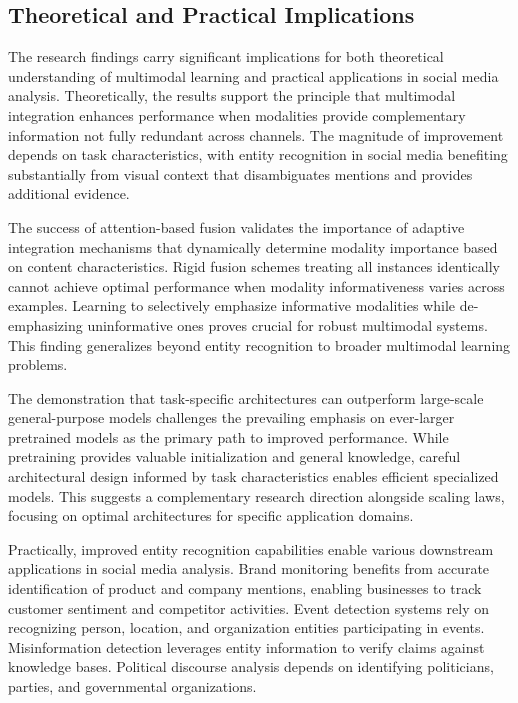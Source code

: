\documentclass[12pt,a4paper]{report}
\begin{document}
\subsection{Theoretical and Practical Implications}

The research findings carry significant implications for both theoretical understanding of multimodal learning and practical applications in social media analysis. Theoretically, the results support the principle that multimodal integration enhances performance when modalities provide complementary information not fully redundant across channels. The magnitude of improvement depends on task characteristics, with entity recognition in social media benefiting substantially from visual context that disambiguates mentions and provides additional evidence.

The success of attention-based fusion validates the importance of adaptive integration mechanisms that dynamically determine modality importance based on content characteristics. Rigid fusion schemes treating all instances identically cannot achieve optimal performance when modality informativeness varies across examples. Learning to selectively emphasize informative modalities while de-emphasizing uninformative ones proves crucial for robust multimodal systems. This finding generalizes beyond entity recognition to broader multimodal learning problems.

The demonstration that task-specific architectures can outperform large-scale general-purpose models challenges the prevailing emphasis on ever-larger pretrained models as the primary path to improved performance. While pretraining provides valuable initialization and general knowledge, careful architectural design informed by task characteristics enables efficient specialized models. This suggests a complementary research direction alongside scaling laws, focusing on optimal architectures for specific application domains.

Practically, improved entity recognition capabilities enable various downstream applications in social media analysis. Brand monitoring benefits from accurate identification of product and company mentions, enabling businesses to track customer sentiment and competitor activities. Event detection systems rely on recognizing person, location, and organization entities participating in events. Misinformation detection leverages entity information to verify claims against knowledge bases. Political discourse analysis depends on identifying politicians, parties, and governmental organizations.
\end{document}
